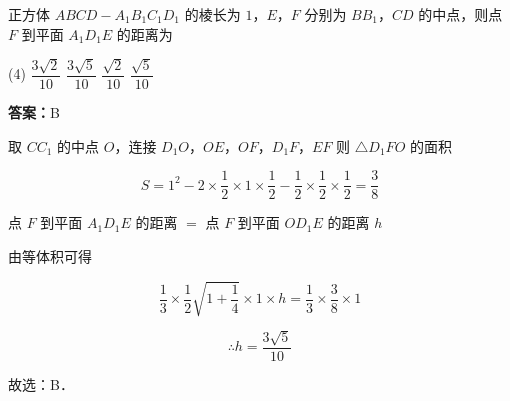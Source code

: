 \vspace{2em}


\begin{example}[\bkstar{3}{5}]
正方体 $ABCD-A_1B_1C_1D_1$ 的棱长为 $1$，$E$，$F$ 分别为 $BB_1$，$CD$ 的中点，则点 $F$ 到平面 $A_1D_1E$ 的距离为
\begin{tasks}(4)
    \task $\dfrac{3\sqrt{2}}{10}$
    \task $\dfrac{3\sqrt{5}}{10}$
    \task $\dfrac{\sqrt{2}}{10}$
    \task $\dfrac{\sqrt{5}}{10}$
\end{tasks}
\end{example}
\begin{solution}
\textbf{答案：}B

取 $CC_1$ 的中点 $O$，连接 $D_1O$，$OE$，$OF$，$D_1F$，$EF$
则 $\triangle D_1FO$ 的面积

$$
S=1^2-2\times\dfrac{1}{2}\times 1\times\dfrac{1}{2}-\dfrac{1}{2}\times\dfrac{1}{2}\times\dfrac{1}{2}=\dfrac{3}{8}
$$

点 $F$ 到平面 $A_1D_1E$ 的距离 $=$ 点 $F$ 到平面 $OD_1E$ 的距离 $h$

由等体积可得

$$
\dfrac{1}{3}\times\dfrac{1}{2}\sqrt{1+\dfrac{1}{4}}\times 1\times h=\dfrac{1}{3}\times\dfrac{3}{8}\times 1
$$

$$
\therefore h=\dfrac{3\sqrt{5}}{10}
$$

故选：B．
\end{solution}

\vspace{2em}

